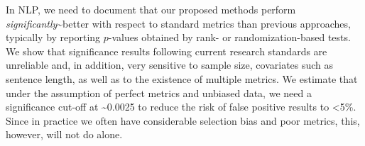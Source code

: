 In NLP, we need to document that our proposed methods perform {\em significantly}{\textasciitilde}better with respect to standard metrics than previous approaches, typically by reporting $p$-values obtained by rank- or randomization-based tests. We show that significance results following current research standards are unreliable and, in addition, very sensitive to sample size, covariates such as sentence length, as well as to the existence of multiple metrics. We estimate that under the assumption of perfect metrics and unbiased data, we need a significance cut-off at {\textasciitilde}0.0025 to reduce the risk of false positive results to <5\%. Since in practice we often have considerable selection bias and poor metrics, this, however, will not do alone.
